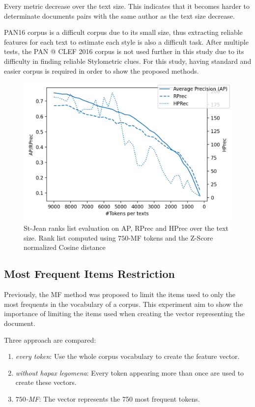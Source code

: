 Every metric decrease over the text size.
This indicates that it becomes harder to determinate documents pairs with the same author as the text size decrease.

PAN16 corpus is a difficult corpus due to its small size, thus extracting reliable features for each text to estimate each style is also a difficult task.
After multiple tests, the PAN @ CLEF 2016 corpus is not used further in this study due to its difficulty in finding reliable Stylometric clues.
For this study, having standard and easier corpus is required in order to show the proposed methods.

\begin{figure}
  \centering
  \caption{St-Jean ranks list evaluation on AP, RPrec and HPrec over the text size. Rank list computed using $750$-MF tokens and the Z-Score normalized Cosine distance}
  \label{fig:degradation}
  \includegraphics[width=\linewidth]{img/degradation.png}
\end{figure}

\subsection{Most Frequent Items Restriction \label{sec:influance_mf_restriction}}

Previously, the MF method was proposed to limit the items used to only the most frequents in the vocabulary of a corpus.
This experiment aim to show the importance of limiting the items used when creating the vector representing the document.

Three approach are compared:
\begin{enumerate}
  \item
  \textit{every token}: Use the whole corpus vocabulary to create the feature vector.
  \item
  \textit{without hapax legomena}: Every token appearing more than once are used to create these vectors.
  \item
  \textit{$750$-MF}: The vector represents the 750 most frequent tokens.
\end{enumerate}


